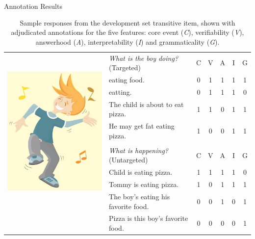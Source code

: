 \documentclass[final,t]{beamer}
\begin{document}
\begin{frame}{}
\begin{columns}[t]
\begin{column}{.33\linewidth}
\begin{block}{Annotation Results}
\begin{center}
\begin{minipage}{.85\textwidth}
\begin{table}[htb!]
\begin{center}
\begin{tabular}{|l||l|c|c|c|c|c|}
\hline
\multirow{10}{*}{\includegraphics[width=0.25\columnwidth]{../figures/I01.jpg}}& \textit{What is the boy doing?} (Targeted) & C & V & A & I & G \\
\cline{2-7}
\cline{2-7}
& eating food. & 0 & 1 & 1 & 1 & 1 \\
\cline{2-7}
& eatting. & 0 & 1 & 1 & 1 & 0 \\
\cline{2-7}
& The child is about to eat pizza. & 1 & 1 & 0 & 1 & 1 \\
\cline{2-7}
& He may get fat eating pizza. & 1 & 0 & 0 & 1 & 1 \\
\cline{2-7}
& \multicolumn{6}{c|}{} \\
\cline{2-7}
& \textit{What is happening?} (Untargeted) & C & V & A & I & G \\
\cline{2-7}
\cline{2-7}
& Child is eating pizza. & 1 & 1 & 1 & 1 & 0 \\
\cline{2-7}
& Tommy is eating pizza. & 1 & 0 & 1 & 1 & 1 \\
\cline{2-7}
& The boy's eating his favorite food. & 0 & 0 & 1 & 0 & 1 \\
\cline{2-7}
& Pizza is this boy's favorite food. & 0 & 0 & 0 & 0 & 1 \\
\hline
\end{tabular}
\caption{\label{tab:devo-transitive} Sample responses from the development set transitive item, shown with adjudicated annotations for the five features: core event (\textit{C}), verifiability (\textit{V}), answerhood (\textit{A}), interpretability (\textit{I}) and grammaticality (\textit{G}).}
\end{center}
\end{table}


\end{minipage}
\end{center}
\end{block}
\end{column}
\end{columns}
\end{frame}
\end{document}
